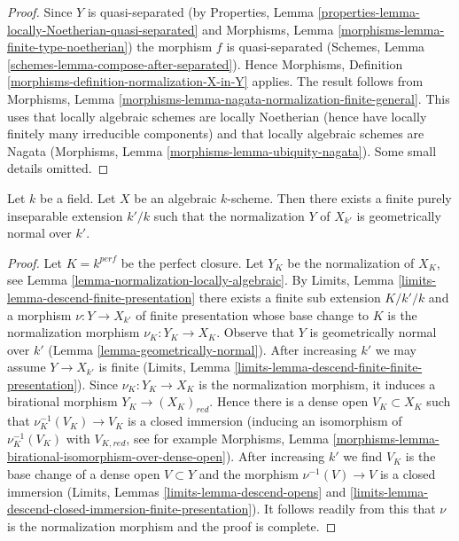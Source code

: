 \begin{proof}
Since $Y$ is quasi-separated (by
Properties, Lemma \ref{properties-lemma-locally-Noetherian-quasi-separated} and
Morphisms, Lemma \ref{morphisms-lemma-finite-type-noetherian})
the morphism $f$ is quasi-separated
(Schemes, Lemma \ref{schemes-lemma-compose-after-separated}).
Hence Morphisms, Definition \ref{morphisms-definition-normalization-X-in-Y}
applies. The result follows from Morphisms, Lemma
\ref{morphisms-lemma-nagata-normalization-finite-general}.
This uses that locally algebraic schemes are locally Noetherian
(hence have locally finitely many irreducible components)
and that locally algebraic schemes are Nagata
(Morphisms, Lemma \ref{morphisms-lemma-ubiquity-nagata}).
Some small details omitted.
\end{proof}

\begin{lemma}
\label{lemma-finite-extension-geometrically-normal}
Let $k$ be a field. Let $X$ be an algebraic $k$-scheme.
Then there exists a finite purely inseparable extension $k'/k$
such that the normalization $Y$ of $X_{k'}$ is geometrically normal over $k'$.
\end{lemma}

\begin{proof}
Let $K = k^{perf}$ be the perfect closure. Let $Y_K$ be the
normalization of $X_K$, see Lemma \ref{lemma-normalization-locally-algebraic}.
By Limits, Lemma \ref{limits-lemma-descend-finite-presentation}
there exists a finite sub extension $K/k'/k$ and a morphism
$\nu : Y \to X_{k'}$ of finite presentation whose base change to $K$
is the normalization morphism $\nu_K : Y_K \to X_K$.
Observe that $Y$ is geometrically normal over $k'$
(Lemma \ref{lemma-geometrically-normal}).
After increasing $k'$ we may assume $Y \to X_{k'}$ is finite
(Limits, Lemma \ref{limits-lemma-descend-finite-finite-presentation}).
Since $\nu_K : Y_K \to X_K$ is the normalization morphism,
it induces a birational morphism $Y_K \to (X_K)_{red}$.
Hence there is a dense open $V_K \subset X_K$ such that
$\nu_K^{-1}(V_K) \to V_K$ is a closed immersion
(inducing an isomorphism of $\nu_K^{-1}(V_K)$ with $V_{K, red}$, see
for example Morphisms, Lemma
\ref{morphisms-lemma-birational-isomorphism-over-dense-open}).
After increasing $k'$ we find $V_K$ is the base change of a dense open
$V \subset Y$ and the morphism $\nu^{-1}(V) \to V$ is a closed immersion
(Limits, Lemmas \ref{limits-lemma-descend-opens} and
\ref{limits-lemma-descend-closed-immersion-finite-presentation}).
It follows readily from this that $\nu$ is the normalization
morphism and the proof is complete.
\end{proof}

